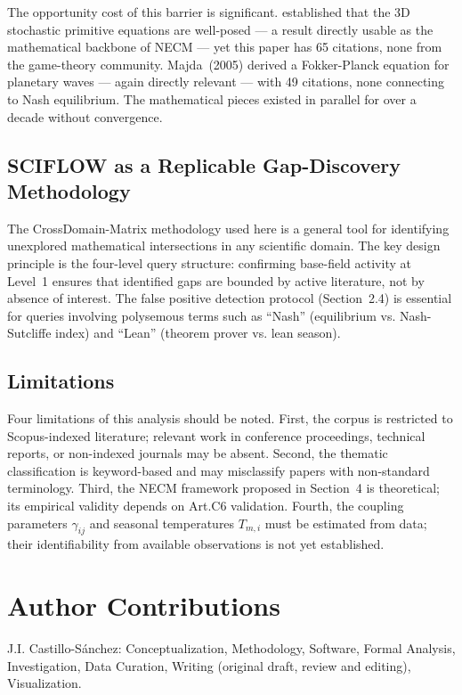 \documentclass[12pt,a4paper]{article}
\begin{document}
The opportunity cost of this barrier is significant. \citet{Debussche2012}
established that the 3D stochastic primitive equations are
well-posed — a result directly usable as the mathematical backbone of
NECM — yet this paper has 65 citations, none from the game-theory
community. Majda~(2005) derived a Fokker-Planck equation for planetary
waves — again directly relevant — with 49 citations, none connecting
to Nash equilibrium. The mathematical pieces existed in parallel for
over a decade without convergence.

\subsection{SCIFLOW as a Replicable Gap-Discovery Methodology}

The CrossDomain-Matrix methodology used here is a general tool for
identifying unexplored mathematical intersections in any scientific
domain. The key design principle is the four-level query structure:
confirming base-field activity at Level~1 ensures that identified gaps
are bounded by active literature, not by absence of interest. The false
positive detection protocol (Section~2.4) is essential for queries
involving polysemous terms such as ``Nash'' (equilibrium vs.
Nash-Sutcliffe index) and ``Lean'' (theorem prover vs. lean season).

\subsection{Limitations}

Four limitations of this analysis should be noted. First, the corpus
is restricted to Scopus-indexed literature; relevant work in conference
proceedings, technical reports, or non-indexed journals may be absent.
Second, the thematic classification is keyword-based and may
misclassify papers with non-standard terminology. Third, the NECM
framework proposed in Section~4 is theoretical; its empirical validity
depends on Art.C6 validation. Fourth, the coupling parameters
$\gamma_{ij}$ and seasonal temperatures $T_{m,i}$ must be estimated
from data; their identifiability from available observations is not
yet established.



\section*{Author Contributions}

J.I. Castillo-Sánchez: Conceptualization, Methodology, Software,
Formal Analysis, Investigation, Data Curation, Writing (original draft,
review and editing), Visualization.
\end{document}
